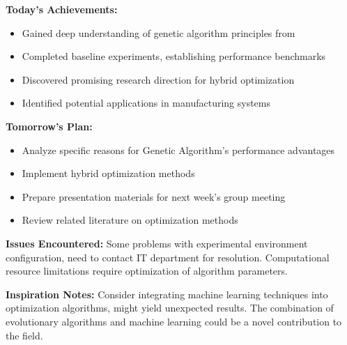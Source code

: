 \documentclass[12pt,a4paper,twoside]{article}
\begin{document}
\begin{summary}
\textbf{Today's Achievements:}
\begin{itemize}
    \item Gained deep understanding of genetic algorithm principles from \cite{he2016deep}
    \item Completed baseline experiments, establishing performance benchmarks
    \item Discovered promising research direction for hybrid optimization
    \item Identified potential applications in manufacturing systems
\end{itemize}

\textbf{Tomorrow's Plan:}
\begin{itemize}
    \item Analyze specific reasons for Genetic Algorithm's performance advantages
    \item Implement hybrid optimization methods
    \item Prepare presentation materials for next week's group meeting
    \item Review related literature on optimization methods \cite{lecun2015deep}
\end{itemize}

\textbf{Issues Encountered:}
Some problems with experimental environment configuration, need to contact IT department for resolution. Computational resource limitations require optimization of algorithm parameters.

\textbf{Inspiration Notes:}
Consider integrating machine learning techniques \cite{vaswani2017attention} into optimization algorithms, might yield unexpected results. The combination of evolutionary algorithms and machine learning could be a novel contribution to the field.
\end{summary}

\printbibliographysection
\end{document}
